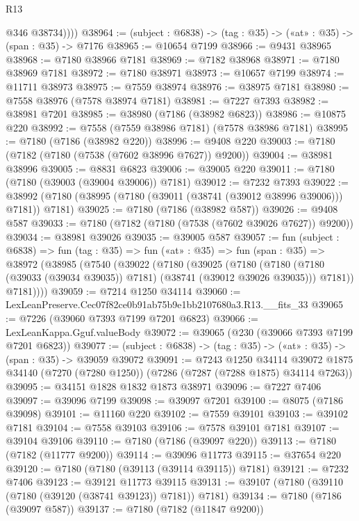 \begin{lexlean}{R13}
\begin{coremodule}
            @346
            @38734))))
@38964 := (subject : @6838) -> (tag : @35) -> («at» : @35) -> (span : @35) -> @7176
@38965 := @10654 @7199
@38966 := @9431 @38965
@38968 := @7180 @38966 @7181
@38969 := @7182 @38968
@38971 := @7180 @38969 @7181
@38972 := @7180 @38971
@38973 := @10657 @7199
@38974 := @11711 @38973
@38975 := @7559 @38974
@38976 := @38975 @7181
@38980 := @7558 @38976 (@7578 @38974 @7181)
@38981 := @7227 @7393
@38982 := @38981 @7201
@38985 := @38980 (@7186 (@38982 @6823))
@38986 := @10875 @220
@38992 := @7558 (@7559 @38986 @7181) (@7578 @38986 @7181)
@38995 := @7180 (@7186 (@38982 @220))
@38996 := @9408 @220
@39003 := @7180 (@7182 (@7180 (@7538 (@7602 @38996 @7627)) @9200))
@39004 := @38981 @38996
@39005 := @8831 @6823
@39006 := @39005 @220
@39011 := @7180 (@7180 (@39003 (@39004 @39006)) @7181)
@39012 := @7232 @7393
@39022 := @38992 (@7180 (@38995 (@7180 (@39011 (@38741 (@39012 @38996 @39006))) @7181)) @7181)
@39025 := @7180 (@7186 (@38982 @587))
@39026 := @9408 @587
@39033 := @7180 (@7182 (@7180 (@7538 (@7602 @39026 @7627)) @9200))
@39034 := @38981 @39026
@39035 := @39005 @587
@39057 := fun (subject : @6838) =>
  fun (tag : @35) =>
  fun («at» : @35) =>
  fun (span : @35) =>
  @38972
    (@38985
      (@7540
        (@39022
          (@7180
            (@39025
              (@7180
                (@7180 (@7180 (@39033 (@39034 @39035)) @7181) (@38741 (@39012 @39026 @39035)))
                @7181))
            @7181))))
@39059 := @7214 @1250 @34114
@39060 := LexLeanPreserve.Cec07f82ce0b91ab75b9e1bb2107680a3.R13.__fits_33
@39065 := @7226 (@39060 @7393 @7199 @7201 @6823)
@39066 := LexLeanKappa.Gguf.valueBody
@39072 := @39065 (@230 (@39066 @7393 @7199 @7201 @6823))
@39077 := (subject : @6838) -> (tag : @35) -> («at» : @35) -> (span : @35) -> @39059 @39072
@39091 := @7243
    @1250
    @34114
    @39072
    @1875
    @34140
    (@7270 (@7280 @1250))
    (@7286 (@7287 (@7288 @1875) @34114 @7263))
@39095 := @34151 @1828 @1832 @1873 @38971
@39096 := @7227 @7406
@39097 := @39096 @7199
@39098 := @39097 @7201
@39100 := @8075 (@7186 @39098)
@39101 := @11160 @220
@39102 := @7559 @39101
@39103 := @39102 @7181
@39104 := @7558 @39103
@39106 := @7578 @39101 @7181
@39107 := @39104 @39106
@39110 := @7180 (@7186 (@39097 @220))
@39113 := @7180 (@7182 (@11777 @9200))
@39114 := @39096 @11773
@39115 := @37654 @220
@39120 := @7180 (@7180 (@39113 (@39114 @39115)) @7181)
@39121 := @7232 @7406
@39123 := @39121 @11773 @39115
@39131 := @39107 (@7180 (@39110 (@7180 (@39120 (@38741 @39123)) @7181)) @7181)
@39134 := @7180 (@7186 (@39097 @587))
@39137 := @7180 (@7182 (@11847 @9200))

\end{coremodule}
\end{lexlean}

